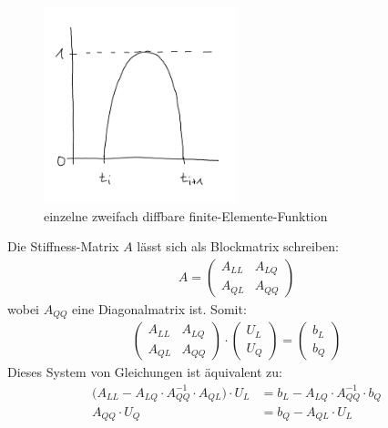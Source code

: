 \begin{figure}[!ht]
	\begin{center}
		\includegraphics[width=0.5\textwidth]{./pics/Sketch2.png}
		\caption{einzelne zweifach diffbare finite-Elemente-Funktion}
		\label{AbbFiniteElementeFunktionZweifachDiffbar}
	\end{center}
\end{figure}

Die Stiffness-Matrix $A$ lässt sich als Blockmatrix schreiben:
\begin{align*}
A=\begin{pmatrix}
A_{LL} & A_{LQ}\\
A_{QL} & A_{QQ}
\end{pmatrix}
\end{align*}
wobei $A_{QQ}$ eine Diagonalmatrix ist. Somit:
\begin{align*}
\begin{pmatrix}
A_{LL} & A_{LQ}\\
A_{QL} & A_{QQ}
\end{pmatrix}\cdot\begin{pmatrix}
U_L\\ U_Q
\end{pmatrix}=
\begin{pmatrix}
b_L\\ b_Q
\end{pmatrix}
\end{align*}
Dieses System von Gleichungen ist äquivalent zu:
\begin{align*}
\big(A_{LL}-A_{LQ}\cdot A^{-1}_{QQ}\cdot A_{QL}\big)\cdot U_L&= b_L-A_{LQ}\cdot A^{-1}_{QQ}\cdot b_Q\\
A_{QQ}\cdot U_Q&= b_Q-A_{QL}\cdot U_L
\end{align*}

